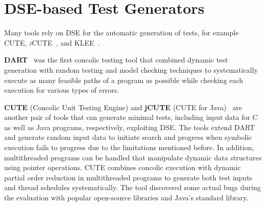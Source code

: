 \documentclass[paper=a4,%
  twoside,%
  BCOR4mm,%
  abstract=true,%
  toc=bibliography,%
  chapterprefix=true,%
  toc=bibliographynumbered,%
  open=right,%
  english,%
  pagesize=pdftex]{scrreprt}
\begin{document}
\section{DSE-based Test Generators}
Many tools rely on \ac{DSE} for the automatic generation of tests, for example \textsc{CUTE}, \textsc{jCUTE}~\cite{Sen2006}, and \textsc{KLEE}~\cite{cadar2008klee}.

\textbf{DART}~\cite{Godefroid_2005} was the first concolic testing tool that combined dynamic test generation with random testing and model checking techniques to systematically execute as many feasible paths of a program as possible while checking each execution for various types of errors.


\textbf{CUTE} (Concolic Unit Testing Engine) and \textbf{jCUTE} (CUTE for Java)~\cite{Sen2006} are another pair of tools that can generate minimal tests, including input data for C as well as Java programs, respectively, exploiting \ac{DSE}. The tools extend \textsc{DART} and generate random input data to initiate search and progress when symbolic execution fails to progress due to the limitations mentioned before. In addition, multithreaded programs can be handled that manipulate dynamic data structures using pointer operations. \textsc{CUTE} combines concolic execution with dynamic partial order reduction in multithreaded programs to generate both test inputs and thread schedules systematically. The tool discovered some actual bugs during the evaluation with popular open-source libraries and Java's standard library.
\end{document}
